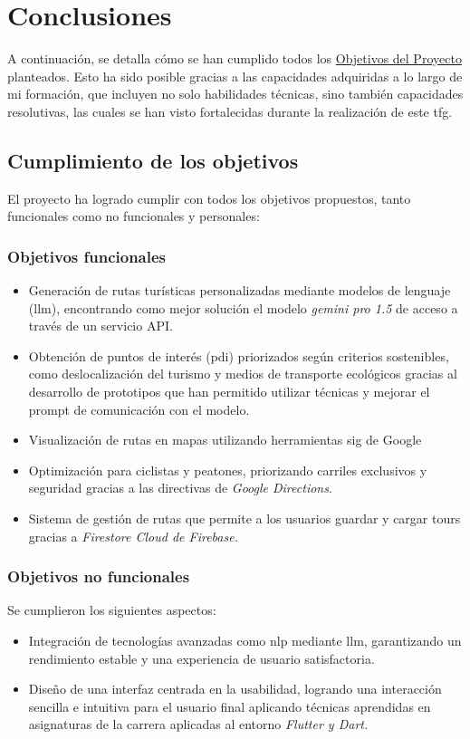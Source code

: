 \section*{Conclusiones}
A continuación, se detalla cómo se han cumplido todos los \hyperref[sec:objetivos]{Objetivos del Proyecto} planteados. Esto ha sido posible gracias a las capacidades adquiridas a lo largo de mi formación, que incluyen no solo habilidades técnicas, sino también capacidades resolutivas, las cuales se han visto fortalecidas durante la realización de este \acrfull{tfg}.

\subsection{Cumplimiento de los objetivos}

El proyecto ha logrado cumplir con todos los objetivos propuestos, tanto funcionales como no funcionales y personales:

\subsubsection{Objetivos funcionales}
\begin{itemize}
	\item Generación de rutas turísticas personalizadas mediante modelos de lenguaje (\acrshort{llm}), encontrando como mejor solución el modelo \textit{gemini pro 1.5} de acceso a través de un servicio API.
	\item Obtención de puntos de interés (\acrshort{pdi}) priorizados según criterios sostenibles, como deslocalización del turismo y medios de transporte ecológicos gracias al desarrollo de prototipos que han permitido utilizar técnicas y mejorar el prompt de comunicación con el modelo.
	\item Visualización de rutas en mapas utilizando herramientas \acrshort{sig} de Google
	\item Optimización para ciclistas y peatones, priorizando carriles exclusivos y seguridad gracias a las directivas de \textit{Google Directions}.
	\item Sistema de gestión de rutas que permite a los usuarios guardar y cargar tours gracias a \textit{Firestore Cloud de Firebase.}
\end{itemize}

\subsubsection{Objetivos no funcionales}
Se cumplieron los siguientes aspectos:
\begin{itemize}
	\item Integración de tecnologías avanzadas como \acrshort{nlp} mediante \acrshort{llm}, garantizando un rendimiento estable y una experiencia de usuario satisfactoria.
	\item Diseño de una interfaz centrada en la usabilidad, logrando una interacción sencilla e intuitiva para el usuario final aplicando técnicas aprendidas en asignaturas de la carrera aplicadas al entorno \textit{Flutter y Dart.}
\end{itemize}

